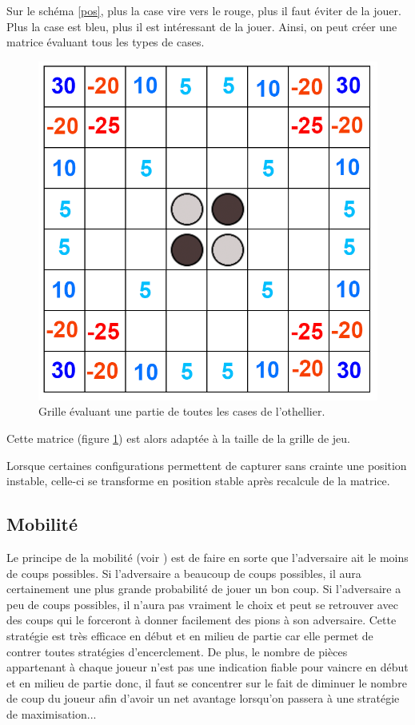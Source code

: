 \documentclass[a4paper,12pt]{report}
\begin{document}
Sur le schéma \ref{pos}, plus la case vire vers le rouge, plus il faut éviter de la jouer. Plus la case est bleu, plus il est intéressant de la jouer.
Ainsi, on peut créer une matrice évaluant tous les types de cases.

\begin{figure}[H]
\centering
\includegraphics[scale=0.2]{Images/positionnement2.png}
\caption{Grille évaluant une partie de toutes les cases de l'othellier.}
\label{pos2}
\end{figure}

Cette matrice (figure \ref{pos2}) est alors adaptée à la taille de la grille de jeu.

Lorsque certaines configurations permettent de capturer sans crainte une position instable, celle-ci se transforme en position stable après recalcule de la matrice.


\subsection{Mobilité}

Le principe de la mobilité (voir \cite{13}) est de faire en sorte que l’adversaire ait le moins de coups possibles. Si l’adversaire a beaucoup de coups possibles, il aura certainement une plus grande probabilité de jouer un bon coup. Si l’adversaire a peu de coups possibles, il n’aura pas vraiment le choix et peut se retrouver avec des coups qui le forceront à donner facilement des pions à son adversaire. Cette stratégie est très efficace en début et en milieu de partie car elle permet de contrer toutes stratégies d’encerclement. De plus, le nombre de pièces appartenant à chaque joueur n’est pas une indication fiable pour vaincre en début et en milieu de partie donc, il faut se concentrer sur le fait de diminuer le nombre de coup du joueur afin d’avoir un net avantage lorsqu’on passera à une stratégie de maximisation...
\end{document}
